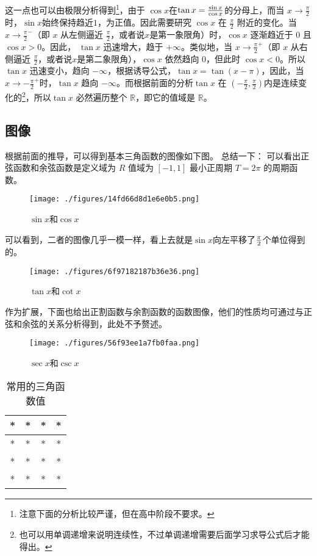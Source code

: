 这一点也可以由极限分析得到\footnote{注意下面的分析比较严谨，但在高中阶段不要求。}，由于 $\cos x$在$\tan x={\sin x\over\cos x}$的分母上，而当 $x \to \frac{\pi}{2}$时，$\sin x $始终保持趋近$1$，为正值。因此需要研究 $\cos x$ 在 $\frac{\pi}{2}$ 附近的变化。当 $x \to \frac{\pi}{2}^-$（即 $x$ 从左侧逼近 $\frac{\pi}{2}$，或者说$x$是第一象限角）时，$\cos x$ 逐渐趋近于 $0$ 且 $\cos x > 0$。因此， $\tan x$ 迅速增大，趋于 $+\infty$。类似地，当 $x \to \frac{\pi}{2}^+$（即 $x$ 从右侧逼近 $\frac{\pi}{2}$，或者说$x$是第二象限角），$\cos x$ 依然趋向 $0$，但此时 $\cos x < 0$。所以 $\tan x$ 迅速变小，趋向 $-\infty$，根据诱导公式，$\tan x=\tan(x-\pi)$，因此，当$x \to -\frac{\pi}{2}^+$时，$\tan x$ 趋向 $-\infty$。而根据前面的分析$\tan x$ 在 $(-\frac{\pi}{2}, \frac{\pi}{2})$内是连续变化的\footnote{也可以用单调递增来说明连续性，不过单调递增需要后面学习求导公式后才能得出。}，所以$\tan x$ 必然遍历整个 $\mathbb{R}$，即它的值域是 $\mathbb{R}$。

\subsection{图像}
根据前面的推导，可以得到基本三角函数的图像如下图。
总结一下：
可以看出正弦函数和余弦函数是定义域为 $R$ 值域为 $[-1,1]$ 最小正周期 $T = 2\pi$ 的周期函数。

\begin{figure}[ht]
\centering
\texttt{[image: ./figures/14fd66d8d1e6e0b5.png]}
\caption{$\sin x$和$\cos x$} \label{fig_HsTFFv_1}
\end{figure}

可以看到，二者的图像几乎一模一样，看上去就是$\sin x$向左平移了${\pi\over2}$个单位得到的。

\begin{figure}[ht]
\centering
\texttt{[image: ./figures/6f97182187b36e36.png]}
\caption{$\tan x$和$\cot x$} \label{fig_HsTFFv_3}
\end{figure}

作为扩展，下面也给出正割函数与余割函数的函数图像，他们的性质均可通过与正弦和余弦的关系分析得到，此处不予赘述。

\begin{figure}[ht]
\centering
\texttt{[image: ./figures/56f93ee1a7fb0faa.png]}
\caption{$\sec x$和$\csc x$} \label{fig_HsTFFv_2}
\end{figure}

\begin{table}[ht]
\centering
\caption{常用的三角函数值}\label{tab_HsTFFv1}
\begin{tabular}{|c|c|c|c|}
\hline
* & * & * & * \\
\hline
* & * & * & * \\
\hline
* & * & * & * \\
\hline
* & * & * & * \\
\hline
\end{tabular}
\end{table}

